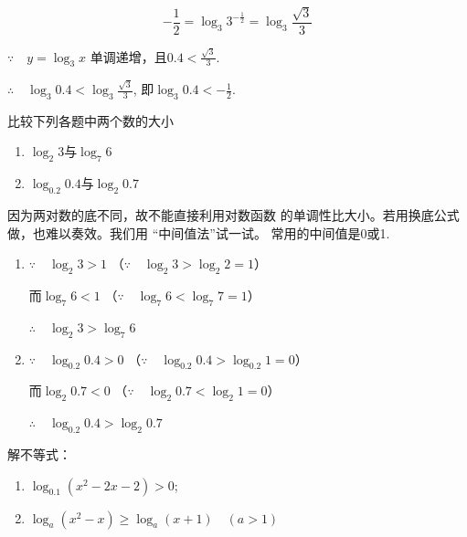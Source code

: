 \begin{solution}
    \[- \frac 12= \log_3 3^{- \frac 12}= \log_{3}\frac {\sqrt {3}}3\]

$\because \quad y= \log_3 x$ 单调递增，且$0.4<\frac{\sqrt{3}}{3}.$

$\therefore \quad \log_3 0.4< \log_{3}\frac{\sqrt{3}}{3}$, 即$\log_3 0.4< - \frac 12.$    
\end{solution}

\begin{example}
    比较下列各题中两个数的大小
\begin{multicols}{2}
\begin{enumerate}[(1)]
    \item $\log_2 3$与$\log_7 6$
    \item $\log_{0.2}0.4$与$\log_2 0.7$
\end{enumerate}
\end{multicols}
\end{example}

\begin{analyze}
  因为两对数的底不同，故不能直接利用对数函数
的单调性比大小。若用换底公式做，也难以奏效。我们用
“中间值法”试一试。 常用的中间值是0或1.  
\end{analyze}

\begin{solution}
\begin{enumerate}[(1)]
    \item $\because\quad \log_2 3 >1$ （$\because\quad \log_2 3>\log_2 2=1$）
    
而$\log_7 6<1$ （$\because\quad \log_7 6<\log_7 7=1$）

$\therefore\quad \log_2 3 >\log_7 6$
\item $\because\quad \log_{0.2} 0.4 >0$ （$\because\quad \log_{0.2} 0.4>\log_{0.2} 1=0$）
    
而$\log_2 0.7<0$ （$\because\quad \log_2 0.7<\log_2 1=0$）

$\therefore\quad \log_{0.2} 0.4 >\log_2 0.7$
\end{enumerate}
\end{solution}

\begin{example}
    解不等式：
\begin{multicols}{2}
   \begin{enumerate}[(1)]
\item $\log_{0.1}(x^2-2x-2)>0$;
\item $\log_a(x^2-x)\ge \log_a (x+1)\quad (a>1)$
\end{enumerate} 
\end{multicols}

\end{example}

